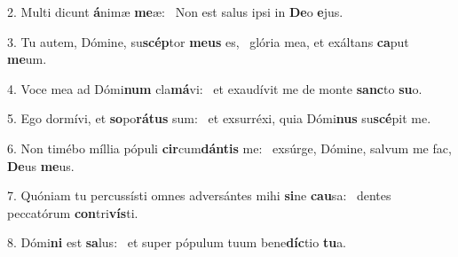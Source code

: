 2. Multi dicunt \textbf{á}nimæ \textbf{me}æ: \ast\  Non est salus ipsi in \textbf{De}o \textbf{e}jus.\

3. Tu autem, Dómine, su\textbf{scép}tor \textbf{me}\textbf{us} es, \ast\  glória mea, et exáltans \textbf{ca}put \textbf{me}um.\

4. Voce mea ad Dómi\textbf{num} cla\textbf{má}vi: \ast\  et exaudívit me de monte \textbf{sanc}to \textbf{su}o.\

5. Ego dormívi, et \textbf{so}po\textbf{rá}\textbf{tus} sum: \ast\  et exsurréxi, quia Dómi\textbf{nus} su\textbf{scé}pit me.\

6. Non timébo míllia pópuli \textbf{cir}cum\textbf{dán}\textbf{tis} me: \ast\  exsúrge, Dómine, salvum me fac, \textbf{De}us \textbf{me}us.\

7. Quóniam tu percussísti omnes adversántes mihi \textbf{si}ne \textbf{cau}sa: \ast\  dentes peccatórum \textbf{con}tri\textbf{vís}ti.\

8. Dómi\textbf{ni} est \textbf{sa}lus: \ast\  et super pópulum tuum bene\textbf{díc}tio \textbf{tu}a.\

